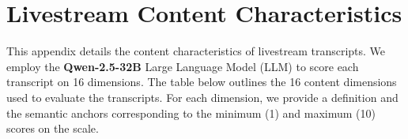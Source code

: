 \newpage
\section{Livestream Content Characteristics}\label{tab:content_variables}

\vspace{0.3cm}
\noindent
\begin{minipage}{\linewidth}
This appendix details the content characteristics of livestream transcripts. We employ the \textbf{Qwen-2.5-32B} Large Language Model (LLM) to score each transcript on 16 dimensions. The table below outlines the 16 content dimensions used to evaluate the transcripts. For each dimension, we provide a definition and the semantic anchors corresponding to the minimum (1) and maximum (10) scores on the scale. %
\end{minipage}

